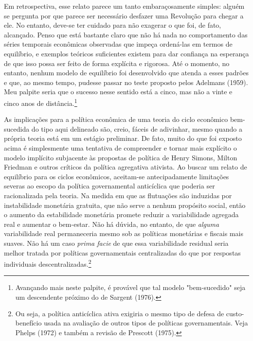 \documentclass[12pt]{article}
\begin{document}
Em retrospectiva, esse relato parece um tanto embaraçosamente simples: alguém se pergunta por que parece ser necessário desfazer uma Revolução para chegar a ele. No entanto, deve-se ter cuidado para não exagerar o que foi, de fato, alcançado. Penso que está bastante claro que não há nada no comportamento das séries temporais econômicas observadas que impeça ordená-las em termos de equilíbrio, e exemplos teóricos suficientes existem para dar confiança na esperança de que isso possa ser feito de forma explícita e rigorosa. Até o momento, no entanto, nenhum modelo de equilíbrio foi desenvolvido que atenda a esses padrões e que, ao mesmo tempo, pudesse passar no teste proposto pelos Adelmans (1959). Meu palpite seria que o sucesso nesse sentido está a cinco, mas não a vinte e cinco anos de distância.\footnote{Avançando mais neste palpite, é provável que tal modelo "bem-sucedido" seja um descendente próximo do de Sargent (1976).}

As implicações para a política econômica de uma teoria do ciclo econômico bem-sucedida do tipo aqui delineado são, creio, fáceis de adivinhar, mesmo quando a própria teoria está em um estágio preliminar. De fato, muito do que foi exposto acima é simplesmente uma tentativa de compreender e tornar mais explícito o modelo implícito subjacente às propostas de política de Henry Simons, Milton Friedman e outros críticos da política agregativa ativista. Ao buscar um relato de equilíbrio para os ciclos econômicos, aceitam-se antecipadamente limitações severas ao escopo da política governamental anticíclica que poderia ser racionalizada pela teoria. Na medida em que as flutuações são induzidas por instabilidade monetária gratuita, que não serve a nenhum propósito social, então o aumento da estabilidade monetária promete reduzir a variabilidade agregada real e aumentar o bem-estar. Não há dúvida, no entanto, de que \textit{alguma} variabilidade real permaneceria mesmo sob as políticas monetárias e fiscais mais suaves. Não há um caso \textit{prima facie} de que essa variabilidade residual seria melhor tratada por políticas governamentais centralizadas do que por respostas individuais descentralizadas.\footnote{Ou seja, a política anticíclica ativa exigiria o mesmo tipo de defesa de custo-benefício usada na avaliação de outros tipos de políticas governamentais. Veja Phelps (1972) e também a revisão de Prescott (1975).}
\end{document}
